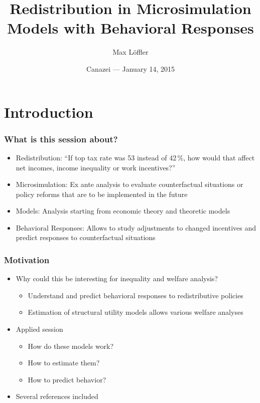 \documentclass[handout,intlimits]{beamer}
\def\litc#1{\textcolor{med-gray}{\tiny\citep{#1}}}
\def\blue#1{\textcolor{zewblue}{#1}}
\begin{document}


\title{Redistribution in Microsimulation\\ Models with Behavioral Responses}
\author[Löffler]{Max Löffler}
\date[January 14, 2015]{Canazei --- January 14, 2015}


\begin{frame}[plain]
	\titlepage
\end{frame}





\section{Introduction}

\begin{frame}
\frametitle{What is this session about?}
\begin{itemize}
	\item \blue{Redistribution:} ``If top tax rate was 53 instead of 42\,\%, how would that affect net incomes, income inequality or work incentives?''
	\bigskip
	\item \blue{Microsimulation:} Ex ante analysis to evaluate counterfactual situations or policy reforms that are to be implemented in the future
	\bigskip
	\item \blue{Models:} Analysis starting from economic theory and theoretic models
	\bigskip
	\item \blue{Behavioral Responses:} Allows to study adjustments to changed incentives and predict responses to counterfactual situations
\end{itemize}
\end{frame}

\begin{frame}
\frametitle{Motivation}
\begin{itemize}
	\item \blue{Why could this be interesting for inequality and welfare analysis?}
	\begin{itemize}
		\item Understand and predict behavioral responses to redistributive policies
		\smallskip
		\item Estimation of structural utility models allows various welfare analyses
	\end{itemize}
	\bigskip
	\item \blue{Applied session}
	\begin{itemize}
		\item How do these models work?
		\smallskip
		\item How to estimate them?
		\smallskip
		\item How to predict behavior?
	\end{itemize}
	\bigskip
	\item \blue{Several references included} \litc{creedy_kalb_2005, creedy_kalb_2006, aaberge_colombino_2014}
\end{itemize}
\end{frame}
\end{document}
